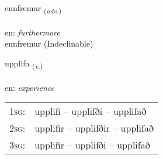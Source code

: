 \documentclass[frontgrid, backgrid]{flacards}\usepackage[]{graphicx}\usepackage[]{color}
\begin{document}

\renewcommand{\flhead}{\vskip5pt \fboxsep=0pt {\small\bfseries\footnotesize Atviksorð | Adverb}}
\renewcommand{\fcfoot}{\vskip5pt \fboxsep=0pt \hspace{2pt}{\small\bfseries\footnotesize 2K}}

\renewcommand{\blhead}{\vskip5pt {\small\bfseries\footnotesize Atviksorð | Adverb }}
\renewcommand{\bcfoot}{\vskip5pt \hspace{2pt}{\small\bfseries\footnotesize 2K}}


{ennfremur \small{\textsubscript{(\textit{adv.})}} \\[1ex]
\textphonetic{[ɛnfrɛmʏr]} \\
en: \emph{furthermore} \\  [2ex]
ennfremur (Indeclinable)}

\renewcommand{\flhead}{\vskip5pt \fboxsep=0pt {\small\bfseries\footnotesize Sagnorð | Verb}}
\renewcommand{\fcfoot}{\vskip5pt \fboxsep=0pt \hspace{2pt}{\small\bfseries\footnotesize 2K}}

\renewcommand{\blhead}{\vskip5pt {\small\bfseries\footnotesize Sagnorð | Verb }}
\renewcommand{\bcfoot}{\vskip5pt \hspace{2pt}{\small\bfseries\footnotesize 2K}}


{upplifa \small{\textsubscript{(\textit{v.})}} \\[1ex] %
\textphonetic{[ʏhplɪva]} \\
en: \emph{experience} \\  [2ex]
\renewcommand*{\arraystretch}{0.8}
\begin{tabular}{p{1cm}l}
\textsc{1sg}: & upplifi -- upplifði -- upplifað \\ 
\textsc{2sg}: & upplifir -- upplifðir -- upplifað \\ 
\textsc{3sg}: & upplifir -- upplifði -- upplifað \\ 
\end{tabular}
}
\end{document}
